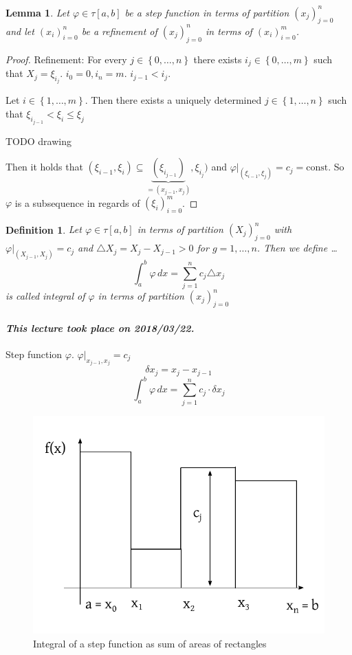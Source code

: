 \documentclass{article}
\newtheorem{definition}{Definition}  \numberwithin{definition}{section}
\newtheorem{lemma}{Lemma}  \numberwithin{lemma}{section}
\newcommand{\set}[1]{\left\{#1\right\}}
\newcommand{\dateref}[1]{\paragraph{\textit{This lecture took place on #1.}}}
\begin{document}
\begin{lemma}
  Let $\varphi \in \tau[a,b]$ be a step function in terms of partition $(x_j)_{j=0}^n$ and let $(x_i)_{i=0}^n$ be a refinement of $(x_j)_{j=0}^n$ in terms of $(x_i)_{i=0}^m$.
\end{lemma}

\begin{proof}
  Refinement: For every $j \in \set{0,\dots,n}$ there exists $i_j \in \set{0,\dots,m}$ such that $X_j = \xi_{i_j}$.
  $i_0 = 0, i_n = m$. $i_{j-1} < i_j$.

  Let $i \in \set{1, \dots, m}$. Then there exists a uniquely determined $j \in \set{1, \dots, n}$ such that $\xi_{i_{j-1}} < \xi_i \leq \xi_j$

  TODO drawing %

  Then it holds that $(\xi_{i-1}, \xi_i) \subseteq \underbrace{(\xi_{i_{j-1}})}_{= (x_{j-1}, x_j)}, \xi_{i_j})$ and $\varphi|_{(\xi_{i-1}, \xi_j)} = c_j = \text{const}$. So $\varphi$ is a subsequence in regards of $(\xi_i)_{i=0}^m$.
\end{proof}

\begin{definition}
  Let $\varphi \in \tau[a,b]$ in terms of partition $(X_j)_{j=0}^n$ with $\varphi|_{(X_{j-1}, X_j)} = c_j$ and $\triangle X_j = X_j - X_{j-1} > 0$ for $g = 1,\dots,n$. Then we define \dots
  \[ \int_a^b \varphi \, dx = \sum_{j=1}^n c_j \triangle x_j \]
  is called \emph{integral of $\varphi$} in terms of partition $(x_j)_{j=0}^n$
\end{definition}

\dateref{2018/03/22}

Step function $\varphi$. $\varphi|_{x_{j-1},x_j} = c_j$
\[ \delta x_j = x_j - x_{j-1} \]
\[ \int_a^b \varphi \, dx = \sum_{j=1}^n c_j \cdot \delta x_j \]

\begin{figure}[!h]
  \begin{center}
    \includegraphics{img/12_integral_of_a_step_function.pdf}
    \caption{Integral of a step function as sum of areas of rectangles}
  \end{center}
\end{figure}
\end{document}
